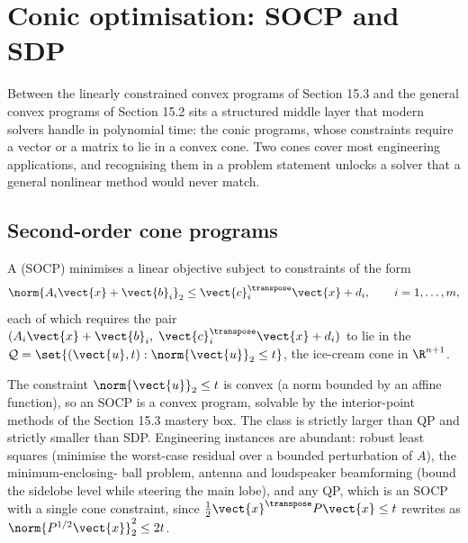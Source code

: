 \section{Conic optimisation: SOCP and SDP}

Between the linearly constrained convex programs of Section 15.3 and
the general convex programs of Section 15.2 sits a structured middle
layer that modern solvers handle in polynomial time: the conic
programs, whose constraints require a vector or a matrix to lie in a
convex cone. Two cones cover most engineering applications, and
recognising them in a problem statement unlocks a solver that a general
nonlinear method would never match.

\subsection{Second-order cone programs}

\begin{definition}
A  (SOCP) minimises a linear
objective subject to constraints of the form
\[
\norm{A_{i} \vect{x} + \vect{b}_{i}}_{2} \leq
\vect{c}_{i}^{\transpose} \vect{x} + d_{i}, \qquad i = 1, \ldots, m,
\]
each of which requires the pair $(A_{i} \vect{x} + \vect{b}_{i}, \;
\vect{c}_{i}^{\transpose} \vect{x} + d_{i})$ to lie in the
 $\mathcal{Q} = \set{(\vect{u}, t) :
\norm{\vect{u}}_{2} \leq t}$, the ice-cream cone in $\R^{n+1}$.
\end{definition}

The constraint $\norm{\vect{u}}_{2} \leq t$ is convex (a norm bounded
by an affine function), so an SOCP is a convex program, solvable by the
interior-point methods of the Section 15.3 mastery box. The class is
strictly larger than QP and strictly smaller than SDP. Engineering
instances are abundant: robust least squares (minimise the worst-case
residual over a bounded perturbation of $A$), the minimum-enclosing-
ball problem, antenna and loudspeaker beamforming (bound the sidelobe
level while steering the main lobe), and any QP, which is an SOCP with
a single cone constraint, since $\tfrac{1}{2} \vect{x}^{\transpose} P
\vect{x} \leq t$ rewrites as $\norm{P^{1/2} \vect{x}}_{2}^{2} \leq 2t$.

